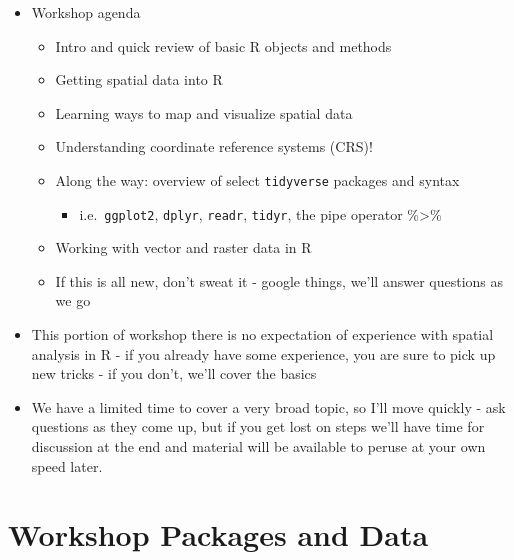 \documentclass[
]{book}
\providecommand{\tightlist}{%
  \setlength{\itemsep}{0pt}\setlength{\parskip}{0pt}}
\begin{document}
\begin{itemize}
\item
  Workshop agenda

  \begin{itemize}
  \tightlist
  \item
    Intro and quick review of basic R objects and methods
  \item
    Getting spatial data into R
  \item
    Learning ways to map and visualize spatial data
  \item
    Understanding coordinate reference systems (CRS)!
  \item
    Along the way: overview of select \texttt{tidyverse} packages and syntax

    \begin{itemize}
    \tightlist
    \item
      i.e.~\texttt{ggplot2}, \texttt{dplyr}, \texttt{readr}, \texttt{tidyr}, the pipe operator \%\textgreater\%
    \end{itemize}
  \item
    Working with vector and raster data in R
  \item
    If this is all new, don't sweat it - google things, we'll answer questions as we go
  \end{itemize}
\item
  This portion of workshop there is no expectation of experience with spatial analysis in R - if you already have some experience, you are sure to pick up new tricks - if you don't, we'll cover the basics
\item
  We have a limited time to cover a very broad topic, so I'll move quickly - ask questions as they come up, but if you get lost on steps we'll have time for discussion at the end and material will be available to peruse at your own speed later.
\end{itemize}

\hypertarget{workshop-packages-and-data}{%
\section{Workshop Packages and Data}\label{workshop-packages-and-data}}
\end{document}
